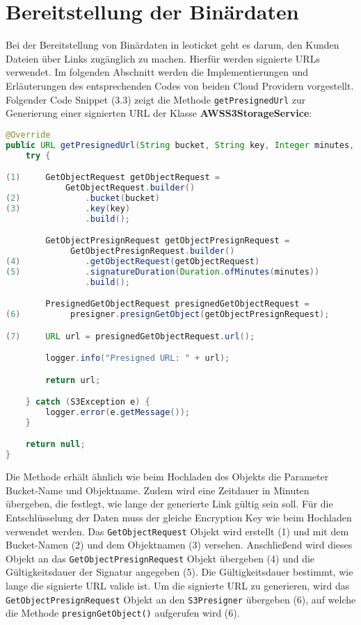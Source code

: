 \newpage

\section{Bereitstellung der Binärdaten}

Bei der Bereitstellung von Binärdaten in leoticket geht es darum, den Kunden Dateien über Links zugänglich zu machen. Hierfür werden signierte URLs verwendet. Im folgenden Abschnitt werden die Implementierungen und Erläuterungen des entsprechenden Codes von beiden Cloud Providern vorgestellt.\\

Folgender Code Snippet (3.3) zeigt die Methode \verb|getPresignedUrl| zur Generierung einer signierten URL der Klasse \textbf{AWSS3StorageService}:

\begin{lstlisting}[language=Java, caption=Prototyp Code Snippet - Generierung einer signierten URL durch AWS]
@Override
public URL getPresignedUrl(String bucket, String key, Integer minutes, String encryptionKey) {
    try {

(1)     GetObjectRequest getObjectRequest = 
			GetObjectRequest.builder()
(2)             .bucket(bucket)
(3)             .key(key)
                .build();

        GetObjectPresignRequest getObjectPresignRequest =                  
             GetObjectPresignRequest.builder()
(4)             .getObjectRequest(getObjectRequest)
(5)             .signatureDuration(Duration.ofMinutes(minutes))
                .build();

        PresignedGetObjectRequest presignedGetObjectRequest =                  
(6)          presigner.presignGetObject(getObjectPresignRequest);

(7)     URL url = presignedGetObjectRequest.url();

        logger.info("Presigned URL: " + url);

        return url;

    } catch (S3Exception e) {
        logger.error(e.getMessage());
    }

    return null;
}
\end{lstlisting}

Die Methode erhält ähnlich wie beim Hochladen des Objekts die Parameter Bucket-Name und Objektname. Zudem wird eine Zeitdauer in Minuten übergeben, die festlegt, wie lange der generierte Link gültig sein soll. Für die Entschlüsselung der Daten muss der gleiche Encryption Key wie beim Hochladen verwendet werden. Das \verb|GetObjectRequest| Objekt wird erstellt (1) und mit dem Bucket-Namen (2) und dem Objektnamen (3) versehen. Anschließend wird dieses Objekt an das \verb|GetObjectPresignRequest| Objekt übergeben (4) und die Gültigkeitsdauer der Signatur angegeben (5). Die Gültigkeitsdauer bestimmt, wie lange die signierte URL valide ist. Um die signierte URL zu generieren, wird das \verb|GetObjectPresignRequest| Objekt an den \verb|S3Presigner| übergeben (6), auf welche die Methode \verb|presignGetObject()| aufgerufen wird (6). 

